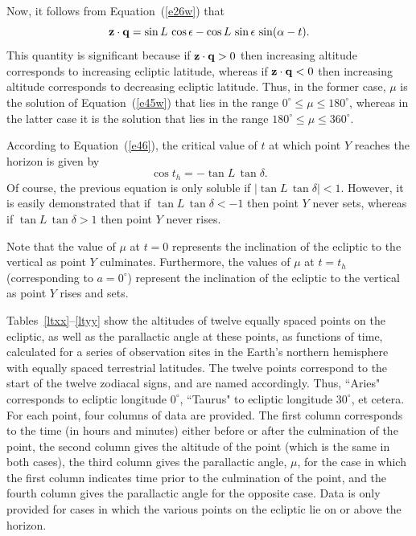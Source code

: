 Now, it follows from Equation~(\ref{e26w}) that
\begin{equation}
{\bf z}\cdot{\bf q} = \sin L\,\cos\epsilon - \cos L\,\sin\epsilon\,\sin(\alpha-t).
\end{equation}
This quantity is significant because if ${\bf z}\cdot{\bf q} > 0$ then increasing altitude corresponds to increasing
ecliptic latitude, whereas if ${\bf z}\cdot{\bf q} <0$ then increasing altitude corresponds to decreasing
ecliptic latitude. Thus, in the former case, $\mu$ is the solution of Equation~(\ref{e45w}) that lies in the range
$0^\circ\leq \mu\leq 180^\circ$, whereas in the latter case it is the solution that lies in the range
$180^\circ\leq \mu\leq 360^\circ$. 

According to Equation~(\ref{e46}), the critical value of $t$ at which point $Y$ reaches the horizon is given by
\begin{equation}
\cos t_h = - \tan L\,\tan\delta.
\end{equation}
Of course, the previous equation is only soluble if $|\tan L\,\tan\delta|<1$.
However, it is easily demonstrated that if $\tan L\,\tan\delta < -1$ then point $Y$ never sets, whereas
if $\tan L\,\tan\delta > 1$ then point $Y$ never rises.

Note that the value of $\mu$ at $t=0$ represents the inclination of the ecliptic to the vertical as point $Y$
culminates. 
Furthermore, the values of $\mu$ at $t=t_h$ (corresponding to $a=0^\circ$) represent  the inclination of the ecliptic to the 
vertical as point $Y$
rises and sets. 

Tables~\ref{ltxx}--\ref{ltyy} show the altitudes of twelve equally spaced points on the
ecliptic, as well as the
parallactic angle at these points, as functions of
time, calculated for a series of observation sites in the Earth's northern hemisphere with
equally spaced terrestrial latitudes. The twelve points correspond to the
start of the twelve zodiacal signs, and are named accordingly. Thus,
``Aries" corresponds to ecliptic longitude $0^\circ$, ``Taurus" to ecliptic
longitude $30^\circ$, et cetera.  For each point, four columns of
data are provided. The first column corresponds to the time  (in hours
and minutes) either before or after the culmination of the point, the
second column gives the altitude of the point (which is the same
in both cases), the third column gives the parallactic angle, $\mu$, for the case in which
the first column indicates time
 prior to the culmination of the point, and the fourth column gives the parallactic angle 
for the opposite case.  Data
is only provided for cases in which the various points on the ecliptic lie on
or above the horizon.

